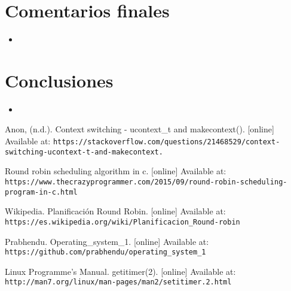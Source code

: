 \documentclass{article}
\begin{document}
\section{Comentarios finales}
\begin{itemize}
  \item 
\end{itemize}

\section{Conclusiones}
\begin{itemize}
  \item 
\end{itemize}

\begin{thebibliography}{99}
   Anon, (n.d.). Context switching - ucontext\_t and makecontext(). [online] Available at: \texttt{https://stackoverflow.com/questions/21468529/context-switching-ucontext-t-and-makecontext.}
  
 Round robin scheduling algorithm in c. [online] Available at: \texttt{https://www.thecrazyprogrammer.com/2015/09/round-robin-scheduling-program-in-c.html}

 Wikipedia. Planificación Round Robin.  [online] Available at: \texttt{https://es.wikipedia.org/wiki/Planificacion_Round-robin} 

 Prabhendu. Operating_system_1.  [online] Available at: \texttt{https://github.com/prabhendu/operating_system_1} 

 Linux Programme's Manual. getitimer(2).  [online] Available at: \texttt{http://man7.org/linux/man-pages/man2/setitimer.2.html} 
 
 
 
\end{thebibliography}
\end{document}
